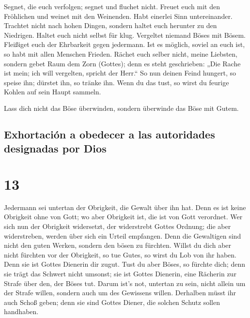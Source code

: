  Segnet, die euch verfolgen; segnet und fluchet nicht.
 Freuet euch mit den Fröhlichen und weinet mit den
Weinenden.  Habt einerlei Sinn untereinander. Trachtet
nicht nach hohen Dingen, sondern haltet euch herunter zu den Niedrigen.
 Haltet euch nicht selbst für klug. Vergeltet niemand
Böses mit Bösem. Fleißiget euch der Ehrbarkeit gegen jedermann.
 Ist es möglich, soviel an euch ist, so habt mit allen
Menschen Frieden.  Rächet euch selber nicht, meine
Liebsten, sondern gebet Raum dem Zorn (Gottes); denn es steht
geschrieben: „Die Rache ist mein; ich will vergelten, spricht der
Herr.``  So nun deinen Feind hungert, so speise ihn;
dürstet ihn, so tränke ihn. Wenn du das tust, so wirst du feurige Kohlen
auf sein Haupt sammeln.

 Lass dich nicht das Böse überwinden, sondern überwinde
das Böse mit Gutem.

\hypertarget{exhortaciuxf3n-a-obedecer-a-las-autoridades-designadas-por-dios}{%
\subsection{Exhortación a obedecer a las autoridades designadas por
Dios}\label{exhortaciuxf3n-a-obedecer-a-las-autoridades-designadas-por-dios}}

\hypertarget{section-12}{%
\section{13}\label{section-12}}

 Jedermann sei untertan der Obrigkeit, die Gewalt über ihn
hat. Denn es ist keine Obrigkeit ohne von Gott; wo aber Obrigkeit ist,
die ist von Gott verordnet.  Wer sich nun der Obrigkeit
widersetzt, der widerstrebt Gottes Ordnung; die aber widerstreben,
werden über sich ein Urteil empfangen.  Denn die
Gewaltigen sind nicht den guten Werken, sondern den bösen zu fürchten.
Willst du dich aber nicht fürchten vor der Obrigkeit, so tue Gutes, so
wirst du Lob von ihr haben.  Denn sie ist Gottes Dienerin
dir zugut. Tust du aber Böses, so fürchte dich; denn sie trägt das
Schwert nicht umsonst; sie ist Gottes Dienerin, eine Rächerin zur Strafe
über den, der Böses tut.  Darum ist's not, untertan zu
sein, nicht allein um der Strafe willen, sondern auch um des Gewissens
willen.  Derhalben müsst ihr auch Schoß geben; denn sie
sind Gottes Diener, die solchen Schutz sollen handhaben.

